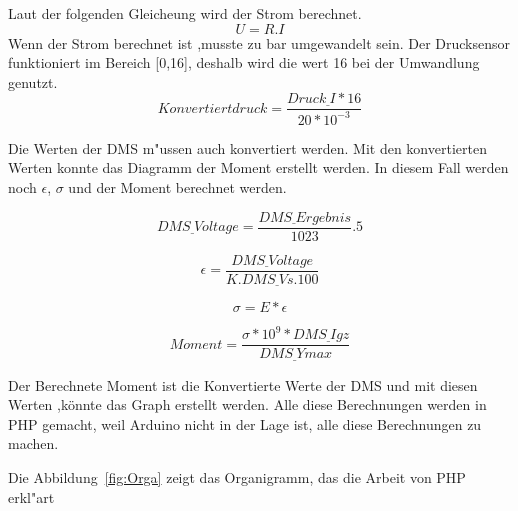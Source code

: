 Laut der folgenden Gleicheung wird der Strom berechnet.
\begin{equation}\label{eq:paran}
U = R.I 
\end{equation}
Wenn der Strom berechnet ist ,musste zu bar umgewandelt sein. Der Drucksensor funktioniert im Bereich [0,16],
deshalb wird die wert 16 bei der Umwandlung genutzt.
\begin{equation}\label{eq:paran}
Konvertiertdruck =\frac{Druck\underline{\ }I*16}{20*10^{-3}}
\end{equation}

Die Werten der DMS m"ussen auch konvertiert werden. Mit den konvertierten 
Werten konnte das Diagramm der Moment erstellt werden.
In diesem Fall werden noch \(\epsilon \), \(\sigma \) und der Moment berechnet werden.

\begin{equation}\label{eq:paran}
DMS\underline{\ }Voltage = \frac{DMS\underline{\ }Ergebnis}{1023}.5
\end{equation}

\begin{equation}\label{eq:paran}
\epsilon  = \frac{DMS\underline{\ }Voltage}{K.DMS\underline{\ }Vs.100}
\end{equation}

\begin{equation}\label{eq:paran}
\sigma  = E*\epsilon
\end{equation}


\begin{equation}\label{eq:paran}
Moment = \frac{\sigma*10^9*DMS\underline{\ }Igz}{DMS\underline{\ }Ymax}
\end{equation}


Der Berechnete Moment ist die Konvertierte Werte der DMS und mit diesen Werten ,könnte das Graph erstellt werden.
Alle diese Berechnungen werden in PHP gemacht, weil Arduino nicht in der Lage ist, alle diese Berechnungen zu machen.

Die Abbildung~\ref{fig:Orga} zeigt das Organigramm, das die Arbeit von PHP erkl"art


